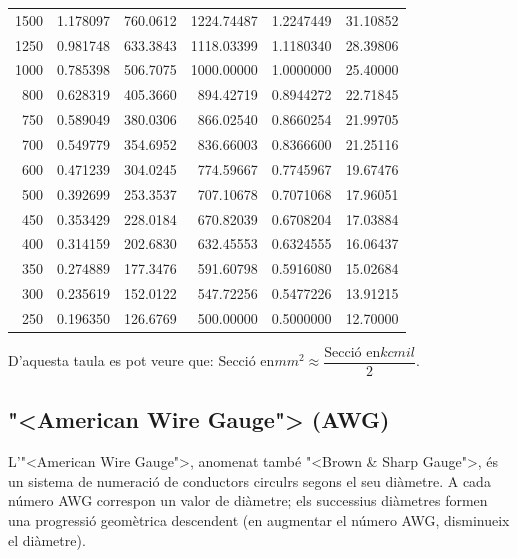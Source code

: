 \begin{longtable}{r<{\hspace{0.6em}}rrrrr}
1500 &   \num{1,178097} &   \num{760,0612}  & \num{1224,74487} &  \num{1,2247449} &   \num{31,10852} \\
1250 &   \num{0,981748} &   \num{633,3843}  & \num{1118,03399} &  \num{1,1180340} &   \num{28,39806} \\
1000 &   \num{0,785398} &   \num{506,7075}  & \num{1000,00000} &  \num{1,0000000} &   \num{25,40000} \\
 800 &   \num{0,628319} &   \num{405,3660}  & \num{ 894,42719} &  \num{0,8944272} &   \num{22,71845} \\
 750 &   \num{0,589049} &   \num{380,0306}  & \num{ 866,02540} &  \num{0,8660254} &   \num{21,99705} \\
 700 &   \num{0,549779} &   \num{354,6952}  & \num{ 836,66003} &  \num{0,8366600} &   \num{21,25116} \\
 600 &   \num{0,471239} &   \num{304,0245}  & \num{ 774,59667} &  \num{0,7745967} &   \num{19,67476} \\
 500 &   \num{0,392699} &   \num{253,3537}  & \num{ 707,10678} &  \num{0,7071068} &   \num{17,96051} \\
 450 &   \num{0,353429} &   \num{228,0184}  & \num{ 670,82039} &  \num{0,6708204} &   \num{17,03884} \\
 400 &   \num{0,314159} &   \num{202,6830}  & \num{ 632,45553} &  \num{0,6324555} &   \num{16,06437} \\
 350 &   \num{0,274889} &   \num{177,3476}  & \num{ 591,60798} &  \num{0,5916080} &   \num{15,02684} \\
 300 &   \num{0,235619} &   \num{152,0122}  & \num{ 547,72256} &  \num{0,5477226} &   \num{13,91215} \\
 250 &   \num{0,196350} &   \num{126,6769}  & \num{ 500,00000} &  \num{0,5000000} &   \num{12,70000} \\
\bottomrule[1pt]
\end{longtable}

D'aquesta taula es pot veure que: $\text{Secci\'{o} en}\unit{mm^2} \approx \dfrac{\text{Secci\'{o} en}\unit{kcmil}}{2}$.


\subsection{{"<}American Wire Gauge{">} (AWG)}\label{sec:awg}

L'{"<}American Wire Gauge{">}, anomenat tamb\'{e} {"<}Brown \& Sharp Gauge{">}, \'{e}s un sistema de numeraci\'{o} de conductors circulrs segons el seu di\`{a}metre. A cada n\'{u}mero AWG correspon un valor de di\`{a}metre; els successius di\`{a}metres formen una progressi\'{o} geom\`{e}trica descendent (en augmentar el n\'{u}mero AWG, disminueix el di\`{a}metre).

